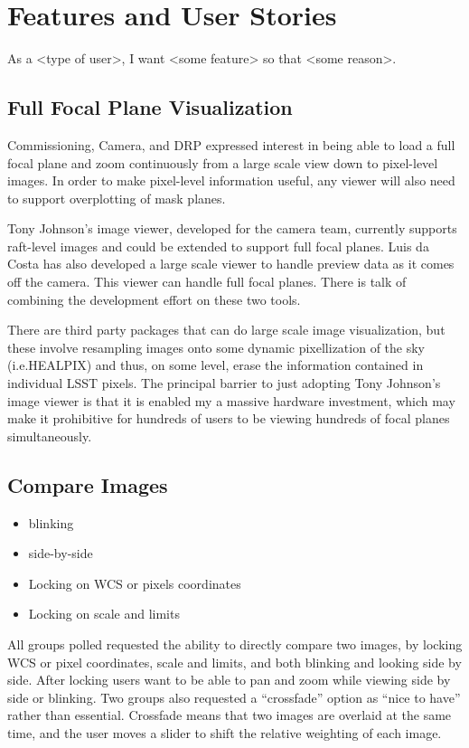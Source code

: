 \section{Features and User Stories}
\label{sec:features}

As a <type of user>, I want <some feature> so that <some reason>. 

\subsection{Full Focal Plane Visualization}

Commissioning, Camera, and DRP expressed interest in being able to load a full focal plane and zoom continuously
from a large scale view down to pixel-level images.  In order to make pixel-level information useful, any
viewer will also need to support overplotting of mask planes.

Tony Johnson's image viewer, developed for the camera team, currently supports raft-level images and could be
extended to support full focal planes.  Luis da Costa has also developed a large scale viewer to handle preview
data as it comes off the camera.  This viewer can handle full focal planes.  There is talk of combining the
development effort on these two tools.

There are third party packages that can do large scale image
visualization, but these involve resampling images onto some dynamic pixellization of the sky (i.e.HEALPIX) and
thus, on some level, erase the information contained in individual LSST pixels.  The principal barrier to just
adopting Tony Johnson's image viewer is that it is enabled my a massive hardware investment, which may make it
prohibitive for hundreds of users to be viewing hundreds of focal planes simultaneously.

\subsection{Compare Images}
\begin{itemize}
\item{blinking}
\item{side-by-side}
\item{Locking on WCS or pixels coordinates}
\item{Locking on scale and limits}
\end{itemize}

All groups polled requested the ability to directly compare two images, by locking WCS or pixel coordinates, scale and limits, and both blinking and looking side by side.
After locking users want to be able to pan and zoom while viewing side by side or blinking.
Two groups also requested a ``crossfade'' option as ``nice to have'' rather than essential.
Crossfade means that two images are overlaid at the same time, and the user moves a slider to shift the relative weighting of each image.

